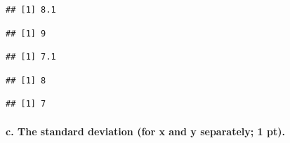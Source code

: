 \documentclass[]{article}
\newenvironment{Shaded}{\begin{snugshade}}{\end{snugshade}}
\newcommand{\KeywordTok}[1]{\textcolor[rgb]{0.13,0.29,0.53}{\textbf{#1}}}
\newcommand{\DecValTok}[1]{\textcolor[rgb]{0.00,0.00,0.81}{#1}}
\newcommand{\StringTok}[1]{\textcolor[rgb]{0.31,0.60,0.02}{#1}}
\newcommand{\OperatorTok}[1]{\textcolor[rgb]{0.81,0.36,0.00}{\textbf{#1}}}
\newcommand{\NormalTok}[1]{#1}
\let\oldparagraph\paragraph
\renewcommand{\paragraph}[1]{\oldparagraph{#1}\mbox{}}
\begin{document}
\begin{verbatim}
## [1] 8.1
\end{verbatim}

\begin{Shaded}
\end{Shaded}

\begin{verbatim}
## [1] 9
\end{verbatim}

\begin{Shaded}
\end{Shaded}

\begin{verbatim}
## [1] 7.1
\end{verbatim}

\begin{Shaded}
\end{Shaded}

\begin{verbatim}
## [1] 8
\end{verbatim}

\begin{Shaded}
\end{Shaded}

\begin{verbatim}
## [1] 7
\end{verbatim}

\paragraph{c. The standard deviation (for x and y separately; 1
pt).}\label{c.-the-standard-deviation-for-x-and-y-separately-1-pt.}
\end{document}

